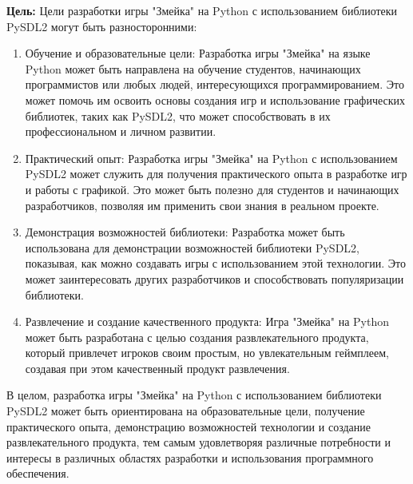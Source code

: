\documentclass[14pt, oneside]{altsu-report}
\begin{document}
\textbf{Цель:}
Цели разработки игры "Змейка" на Python с использованием библиотеки PySDL2 могут быть разносторонними:
\begin{enumerate}
    \item Обучение и образовательные цели: Разработка игры "Змейка" на языке Python может быть направлена на обучение студентов, начинающих программистов или любых людей, интересующихся программированием. Это может помочь им освоить основы создания игр и использование графических библиотек, таких как PySDL2, что может способствовать в их профессиональном и личном развитии.
    \item Практический опыт: Разработка игры "Змейка" на Python с использованием PySDL2 может служить для получения практического опыта в разработке игр и работы с графикой. Это может быть полезно для студентов и начинающих разработчиков, позволяя им применить свои знания в реальном проекте.
    \item Демонстрация возможностей библиотеки: Разработка может быть использована для демонстрации возможностей библиотеки PySDL2, показывая, как можно создавать игры с использованием этой технологии. Это может заинтересовать других разработчиков и способствовать популяризации библиотеки.
    \item Развлечение и создание качественного продукта: Игра "Змейка" на Python может быть разработана с целью создания развлекательного продукта, который привлечет игроков своим простым, но увлекательным геймплеем, создавая при этом качественный продукт развлечения.
\end{enumerate}
В целом, разработка игры "Змейка" на Python с использованием библиотеки PySDL2 может быть ориентирована на образовательные цели, получение практического опыта, демонстрацию возможностей технологии и создание развлекательного продукта, тем самым удовлетворяя различные потребности и интересы в различных областях разработки и использования программного обеспечения.
\end{document}
